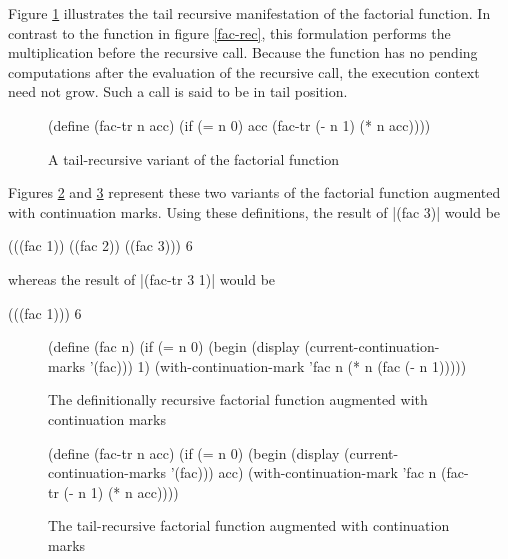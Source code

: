 \documentclass[ms,electronic,twosidetoc,letterpaper,chaptercenter,parttop]{byumsphd}
\begin{document}
Figure \ref{fac-tail-rec} illustrates the tail recursive manifestation of the factorial
function. In contrast to the function in figure \ref{fac-rec}, this formulation performs
the multiplication before the recursive call. Because the function has no pending
computations after the evaluation of the recursive call, the execution context need not
grow. Such a call is said to be in tail position.

\begin{figure}
\begin{schemedisplay}
(define (fac-tr n acc)
  (if (= n 0)
      acc
      (fac-tr (- n 1) (* n acc))))
\end{schemedisplay}
\caption{A tail-recursive variant of the factorial function}
\label{fac-tail-rec}
\end{figure}

Figures \ref{fac-rec-cm} and \ref{fac-tail-rec-cm} represent these two variants of the
factorial function augmented with continuation marks. Using these definitions, the 
result of \scheme|(fac 3)| would be

\begin{schemedisplay}
(((fac 1)) ((fac 2)) ((fac 3)))
6
\end{schemedisplay}

whereas the result of \scheme|(fac-tr 3 1)| would be

\begin{schemedisplay}
(((fac 1)))
6
\end{schemedisplay}

\begin{figure}
\begin{schemedisplay}
(define (fac n)
  (if (= n 0)
      (begin
        (display (current-continuation-marks '(fac)))
        1)
      (with-continuation-mark 'fac n (* n (fac (- n 1)))))
\end{schemedisplay}
\caption{The definitionally recursive factorial function augmented with continuation marks}
\label{fac-rec-cm}
\end{figure}

\begin{figure}
\begin{schemedisplay}
(define (fac-tr n acc)
  (if (= n 0)
      (begin
        (display (current-continuation-marks '(fac)))
        acc)
      (with-continuation-mark 'fac n (fac-tr (- n 1) (* n acc))))
\end{schemedisplay}
\caption{The tail-recursive factorial function augmented with continuation marks}
\label{fac-tail-rec-cm}
\end{figure}
\end{document}
